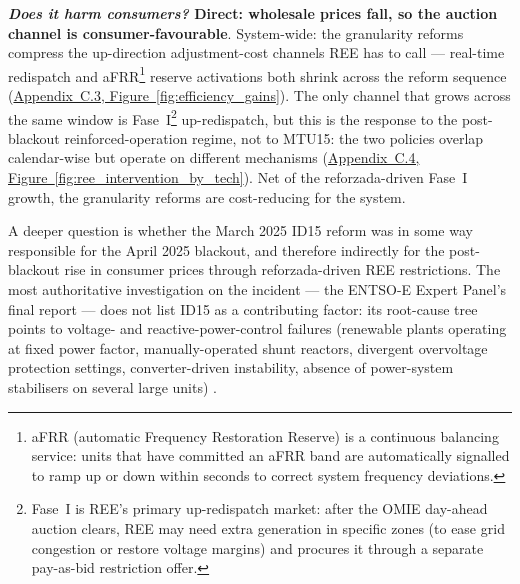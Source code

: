 \documentclass[11pt]{article}
\begin{document}
\textbf{\emph{Does it harm consumers?} Direct: wholesale prices fall, so the auction channel is consumer-favourable}. System-wide: the granularity reforms compress the up-direction adjustment-cost channels REE has to call --- real-time redispatch and aFRR\footnote{aFRR (automatic Frequency Restoration Reserve) is a continuous balancing service: units that have committed an aFRR band are automatically signalled to ramp up or down within seconds to correct system frequency deviations.} reserve activations both shrink across the reform sequence (\hyperref[fig:efficiency_gains]{Appendix~C.3, Figure~\ref*{fig:efficiency_gains}}). The only channel that grows across the same window is Fase~I\footnote{Fase~I is REE's primary up-redispatch market: after the OMIE day-ahead auction clears, REE may need extra generation in specific zones (to ease grid congestion or restore voltage margins) and procures it through a separate pay-as-bid restriction offer.} up-redispatch, but this is the response to the post-blackout reinforced-operation regime, not to MTU15: the two policies overlap calendar-wise but operate on different mechanisms (\hyperref[fig:ree_intervention_by_tech]{Appendix~C.4, Figure~\ref*{fig:ree_intervention_by_tech}}). Net of the reforzada-driven Fase~I growth, the granularity reforms are cost-reducing for the system.

A deeper question is whether the March 2025 ID15 reform was in some way responsible for the April 2025 blackout, and therefore indirectly for the post-blackout rise in consumer prices through reforzada-driven REE restrictions. The most authoritative investigation on the incident --- the ENTSO-E Expert Panel's final report --- does not list ID15 as a contributing factor: its root-cause tree points to voltage- and reactive-power-control failures (renewable plants operating at fixed power factor, manually-operated shunt reactors, divergent overvoltage protection settings, converter-driven instability, absence of power-system stabilisers on several large units) \citep{entsoe_blackout_iberia_2026}.
\end{document}
